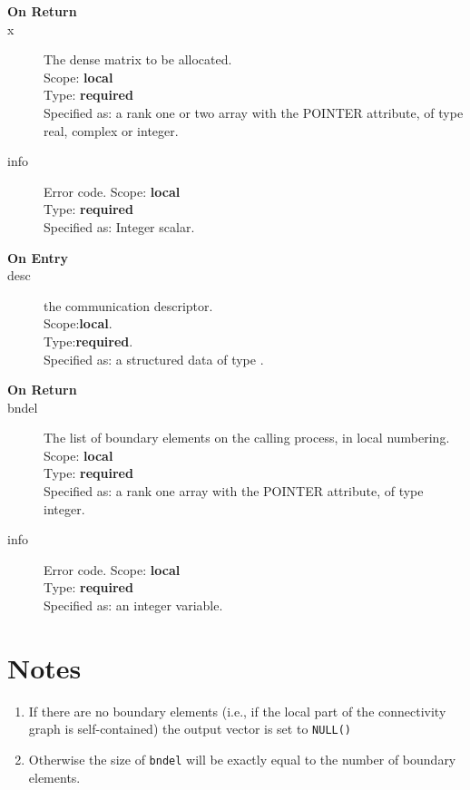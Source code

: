 \begin{description}
\item[\bf On Return]
\item[x] The dense matrix to be allocated.\\
Scope: {\bf local} \\
Type: {\bf required}\\
Specified as: a rank one or two array with the POINTER
attribute, of type real, complex or integer.\\
\item[info] Error code.
Scope: {\bf local} \\
Type: {\bf required}\\
Specified as: Integer scalar.
\end{description}


%
%


\begin{description}
\item[\bf On Entry]
\item[desc] the communication descriptor.\\
Scope:{\bf local}.\\
Type:{\bf required}.\\
Specified as: a structured data of type \descdata.
\end{description}

\begin{description}
\item[\bf On Return]
\item[bndel] The list of boundary elements on the calling process, in
  local numbering.\\
Scope: {\bf local} \\
Type: {\bf required}\\
Specified as: a rank one array with the POINTER
attribute, of type integer.\\
\item[info] Error code.
Scope: {\bf local} \\
Type: {\bf required}\\
Specified as: an integer variable.
\end{description}

\section*{Notes}
\begin{enumerate}
\item If there are no boundary elements (i.e., if the local part of
  the connectivity graph is self-contained) the output vector is set
  to \verb|NULL()|
\item Otherwise the size of \verb|bndel| will be exactly equal to the
  number of boundary elements. 
\end{enumerate}

